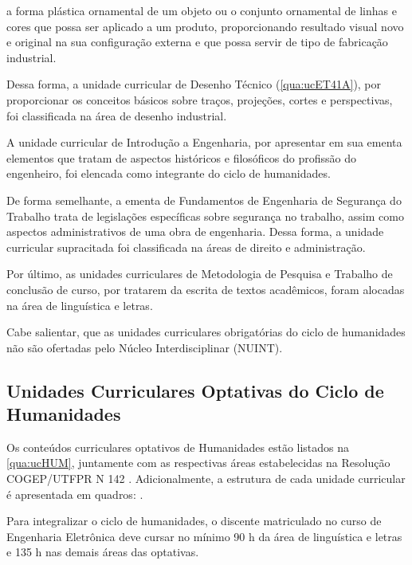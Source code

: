 \begin{citacao}
	a forma plástica ornamental de um objeto ou o conjunto ornamental de linhas e cores que possa ser aplicado a um produto, proporcionando resultado visual novo e original na sua configuração externa e que possa servir de tipo de fabricação industrial.
\end{citacao}

Dessa forma, a unidade curricular de Desenho Técnico (\autoref{qua:ucET41A}), por proporcionar os conceitos básicos sobre traços, projeções, cortes e perspectivas, foi classificada na área de desenho industrial.

A unidade curricular de Introdução a Engenharia, por apresentar em sua ementa elementos que tratam de aspectos históricos e filosóficos do profissão do engenheiro, foi elencada como integrante do ciclo de humanidades.

De forma semelhante, a ementa de Fundamentos de Engenharia de Segurança do Trabalho trata de legislações específicas sobre segurança no trabalho, assim como aspectos administrativos de uma obra de engenharia. Dessa forma, a unidade curricular supracitada foi classificada na áreas de direito e administração.

Por último, as unidades curriculares de Metodologia de Pesquisa e Trabalho de conclusão de curso, por tratarem da escrita de textos acadêmicos, foram alocadas na área de linguística e letras.

Cabe salientar, que as unidades curriculares obrigatórias do ciclo de humanidades não são ofertadas pelo Núcleo Interdisciplinar (NUINT).



\subsection{Unidades Curriculares Optativas do Ciclo de Humanidades}
\label{subsec:opthumanidades}

Os conteúdos curriculares optativos de Humanidades estão listados na \autoref{qua:ucHUM}, juntamente com as respectivas áreas estabelecidas na Resolução COGEP/UTFPR N\textordmasculine{} 142 \cite{cogep142}. Adicionalmente, a estrutura de cada unidade curricular é apresentada em quadros: .

Para integralizar o ciclo de humanidades, o discente matriculado no curso de Engenharia Eletrônica deve cursar no mínimo 90 h da área de linguística e letras e 135 h nas demais áreas das optativas.

